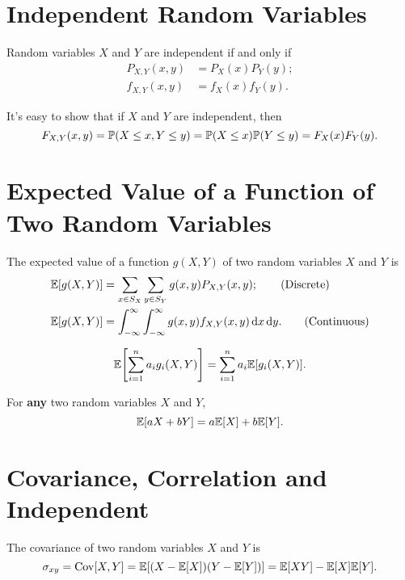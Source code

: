 \section{Independent Random Variables}
\begin{definition}
    Random variables $X$ and $Y$ are independent if and only if
    \begin{align}
        P_{X,Y}(x,y) &=P_X(x)P_Y(y); \tag{Discrete}\\
        f_{X,Y}(x,y) &=f_X(x)f_Y(y). \tag{Continuous}
    \end{align}
\end{definition}
It's easy to show that if $X$ and $Y$ are independent, then
\[F_{X,Y}(x,y)=\P{X\leq x, Y\leq y}=\P{X\leq x}\P{Y\leq y}=F_X(x)F_Y(y).\]

\section{Expected Value of a Function of Two Random Variables}
\begin{theorem}
    The expected value of a function $g(X,Y)$ of two random variables $X$ and $Y$ is
    \begin{align}
        \E{g(X,Y)} &= \sum_{x\in S_X}\sum_{y\in S_Y}g(x,y)P_{X,Y}(x,y); \tag{Discrete}\\
        \E{g(X,Y)} &= \int_{-\infty}^{\infty}\int_{-\infty}^{\infty}g(x,y)f_{X,Y}(x,y)\diff x\diff y. \tag{Continuous}
    \end{align}
\end{theorem}

\begin{theorem}
    \[\E{\sum_{i=1}^{n}a_i g_i(X,Y)}=\sum_{i=1}^{n}a_i\E{g_i(X,Y)}.\]
\end{theorem}

\begin{theorem}
    For \textbf{any} two random variables $X$ and $Y$,
    \[\E{aX+bY}=a\E{X}+b\E{Y}.\]
\end{theorem}

\section{Covariance, Correlation and Independent}
\begin{definition}[Covariance]
    The covariance of two random variables $X$ and $Y$ is
    \[\sigma_{xy}=\Cov[X,Y]=\E{(X-\E{X})(Y-\E{Y})}=\E{XY}-\E{X}\E{Y}.\]
\end{definition}


